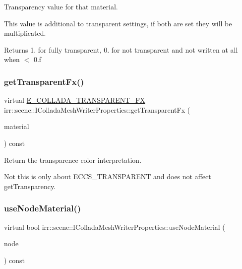 Transparency value for that material. 

This value is additional to transparent settings, if both are set they will be multiplicated. \begin{DoxyReturn}{Returns}
1. for fully transparent, 0. for not transparent and not written at all when $<$ 0.\+f 
\end{DoxyReturn}
\mbox{\label{classirr_1_1scene_1_1IColladaMeshWriterProperties_a0d934ae86d3e587ae22f74d775bbfa36}} 
\subsubsection{\texorpdfstring{get\+Transparent\+Fx()}{getTransparentFx()}}
{\footnotesize\ttfamily virtual \hyperlink{namespaceirr_1_1scene_af7dadd5b96b683cfe1800f343c4f6619}{E\+\_\+\+C\+O\+L\+L\+A\+D\+A\+\_\+\+T\+R\+A\+N\+S\+P\+A\+R\+E\+N\+T\+\_\+\+FX} irr\+::scene\+::\+I\+Collada\+Mesh\+Writer\+Properties\+::get\+Transparent\+Fx (\begin{DoxyParamCaption}\item[{const \hyperlink{classirr_1_1video_1_1SMaterial}{video\+::\+S\+Material} \&}]{material }\end{DoxyParamCaption}) const\hspace{0.3cm}{\ttfamily [pure virtual]}}



Return the transparence color interpretation. 

Not this is only about E\+C\+C\+S\+\_\+\+T\+R\+A\+N\+S\+P\+A\+R\+E\+NT and does not affect get\+Transparency. \mbox{\label{classirr_1_1scene_1_1IColladaMeshWriterProperties_a9c10df4dc3602efbba6a47b34e2f8f4b}} 
\subsubsection{\texorpdfstring{use\+Node\+Material()}{useNodeMaterial()}}
{\footnotesize\ttfamily virtual bool irr\+::scene\+::\+I\+Collada\+Mesh\+Writer\+Properties\+::use\+Node\+Material (\begin{DoxyParamCaption}\item[{const \hyperlink{classirr_1_1scene_1_1ISceneNode}{scene\+::\+I\+Scene\+Node} $\ast$}]{node }\end{DoxyParamCaption}) const\hspace{0.3cm}{\ttfamily [pure virtual]}}



